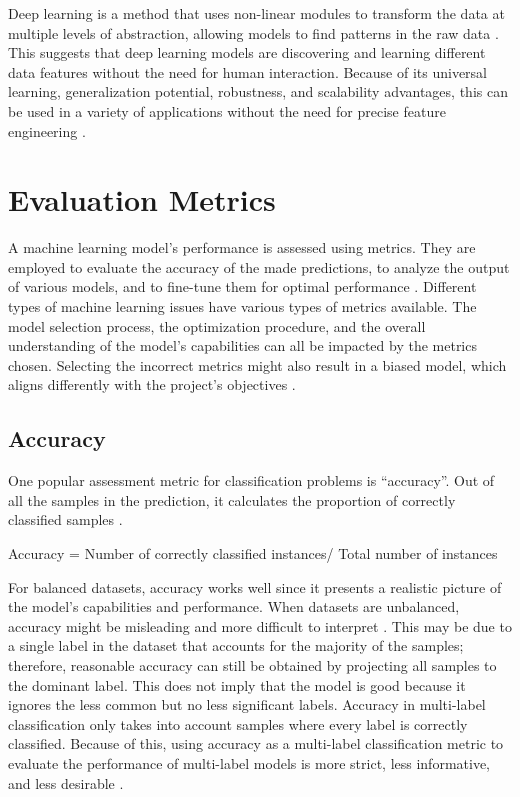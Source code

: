 Deep learning is a method that uses non-linear modules to transform the data at multiple levels of abstraction, allowing models to find patterns in the raw data \citep{helland_tackling_2023}. This suggests that deep learning models are discovering and learning different data features without the need for human interaction. Because of its universal learning, generalization potential, robustness, and scalability advantages, this can be used in a variety of applications without the need for precise feature engineering \citep{helland_tackling_2023}.

\section{Evaluation Metrics}

A machine learning model's performance is assessed using metrics. They are employed to evaluate the accuracy of the made predictions, to analyze the output of various models, and to fine-tune them for optimal performance \citep{helland_tackling_2023}. Different types of machine learning issues have various types of metrics available. The model selection process, the optimization procedure, and the overall understanding of the model's capabilities can all be impacted by the metrics chosen. Selecting the incorrect metrics might also result in a biased model, which aligns differently with the project's objectives \citep{helland_tackling_2023}.

\subsection{Accuracy}

One popular assessment metric for classification problems is “accuracy”. Out of all the samples in the prediction, it calculates the proportion of correctly classified samples \citep{helland_tackling_2023}. 

Accuracy = Number of correctly classified instances/ Total number of instances

For balanced datasets, accuracy works well since it presents a realistic picture of the model's capabilities and performance. When datasets are unbalanced, accuracy might be misleading and more difficult to interpret \citep{helland_tackling_2023}. This may be due to a single label in the dataset that accounts for the majority of the samples; therefore, reasonable accuracy can still be obtained by projecting all samples to the dominant label. This does not imply that the model is good because it ignores the less common but no less significant labels. Accuracy in multi-label classification only takes into account samples where every label is correctly classified. Because of this, using accuracy as a multi-label classification metric to evaluate the performance of multi-label models is more strict, less informative, and less desirable \citep{helland_tackling_2023}.